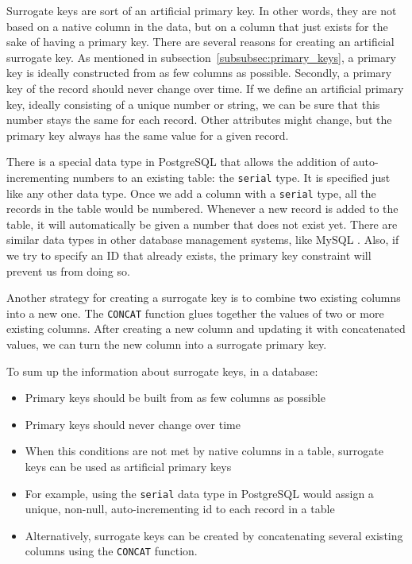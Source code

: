 \documentclass[11pt]{article}
\begin{document}
    Surrogate keys are sort of an artificial primary key.
    In other words, they are not based on a native column in the data, but on a column that just exists for the sake of having a primary key.
    There are several reasons for creating an artificial surrogate key.
    As mentioned in subsection~\ref{subsubsec:primary_keys}, a primary key is ideally constructed from as few columns as possible.
    Secondly, a primary key of the record should never change over time.
    If we define an artificial primary key, ideally consisting of a unique number or string, we can be sure that this number stays the same for each record.
    Other attributes might change, but the primary key always has the same value for a given record.

    There is a special data type in PostgreSQL that allows the addition of auto-incrementing numbers to an existing table: the \texttt{serial} type.
    It is specified just like any other data type.
    Once we add a column with a \texttt{serial} type, all the records in the table would be numbered.
    Whenever a new record is added to the table, it will automatically be given a number that does not exist yet.
    There are similar data types in other database management systems, like MySQL .
    Also, if we try to specify an ID that already exists, the primary key constraint will prevent us from doing so.

    Another strategy for creating a surrogate key is to combine two existing columns into a new one.
    The \texttt{CONCAT} function glues together the values of two or more existing columns.
    After creating a new column and updating it with concatenated values, we can turn the new column into a surrogate primary key.

    To sum up the information about surrogate keys, in a database:

    \begin{itemize}
        \item Primary keys should be built from as few columns as possible
        \item Primary keys should never change over time
        \item When this conditions are not met by native columns in a table, surrogate keys can be used as artificial primary keys
        \item For example, using the \texttt{serial} data type in PostgreSQL would assign a unique, non-null, auto-incrementing id to each record in a table
        \item Alternatively, surrogate keys can be created by concatenating several existing columns using the \texttt{CONCAT} function.
    \end{itemize}
\end{document}

